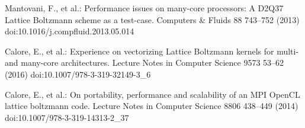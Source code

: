\documentclass[times]{cpeauth}
\begin{document}
\begin{thebibliography}{10}
Mantovani, F., et al.:
Performance issues on many-core processors: A D2Q37 Lattice Boltzmann scheme as a test-case.
Computers \& Fluids 88 743--752 (2013) 
doi:10.1016/j.compfluid.2013.05.014

Calore, E., et al.:
Experience on vectorizing Lattice Boltzmann kernels for multi- and many-core architectures. 
Lecture Notes in Computer Science 9573 53--62 (2016) 
doi:10.1007/978-3-319-32149-3\_6

Calore, E., et al.:
On portability, performance and scalability of an MPI OpenCL lattice boltzmann code.
Lecture Notes in Computer Science 8806 438--449 (2014) 
doi:10.1007/978-3-319-14313-2\_37


\end{thebibliography}

\end{document}
